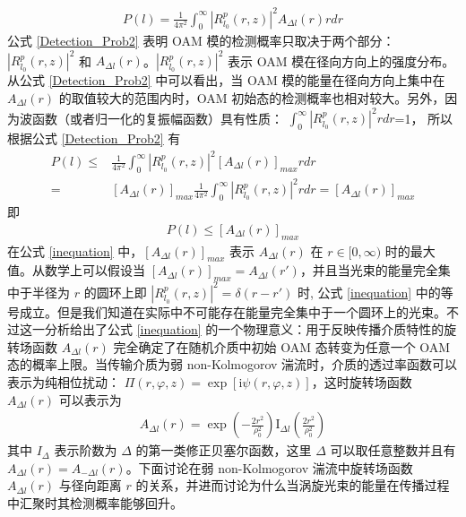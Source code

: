 \documentclass[master]{thesis-uestc}
\begin{document}
\begin{equation}\label{Detection_Prob2}
 \begin{split}
 P(l)=\frac{1}{4\pi^2}\int_0^{\infty}|R_{l_0}^p(r,z)|^2 A_{\Delta l}(r)rdr
 \end{split}
\end{equation}
\noindent 公式 \eqref{Detection_Prob2} 表明 OAM 模的检测概率只取决于两个部分：$|R_{l_0}^p(r,z)|^2$ 和 $A_{\Delta l}(r)$。$|R_{l_0}^p(r,z)|^2$ 表示 OAM 模在径向方向上的强度分布。从公式 \eqref{Detection_Prob2} 中可以看出，当 OAM 模的能量在径向方向上集中在 $A_{\Delta l}(r)$ 的取值较大的范围内时，OAM 初始态的检测概率也相对较大。另外，因为波函数（或者归一化的复振幅函数）具有性质： $\int_0^{\infty}|R_{l_0}^p(r,z)|^2 rdr$=1， 所以根据公式 \eqref{Detection_Prob2} 有
\begin{equation}\label{inequation1}
\begin{split}
P(l)\leq & \frac{1}{4\pi^2}\int_0^{\infty}|R_{l_0}^p(r,z)|^2 [A_{\Delta l}(r)]_{max}rdr\\
        =& [A_{\Delta l}(r)]_{max}\frac{1}{4\pi^2}\int_0^{\infty}|R_{l_0}^p(r,z)|^2rdr=[A_{\Delta l}(r)]_{max}
\end{split}
\end{equation}\label{inequation1}
\noindent 即
\begin{equation}\label{inequation}
 \begin{split}
 P(l)\leq [A_{\Delta l}(r)]_{max}
 \end{split}
\end{equation}
\noindent 在公式 \eqref{inequation} 中，$[A_{\Delta l}(r)]_{max}$ 表示 $A_{\Delta l}(r)$ 在 $r\in[0,\infty)$ 时的最大值。从数学上可以假设当 $[A_{\Delta l}(r)]_{max}=A_{\Delta l}(r')$，并且当光束的能量完全集中于半径为 $r$ 的圆环上即 $|R_{l_0}^p(r,z)|^2=\delta (r-r')$ 时, 公式 \eqref{inequation} 中的等号成立。但是我们知道在实际中不可能存在能量完全集中于一个圆环上的光束。不过这一分析给出了公式 \eqref{inequation} 的一个物理意义：用于反映传播介质特性的旋转场函数 $A_{\Delta l}(r)$ 完全确定了在随机介质中初始 OAM 态转变为任意一个 OAM 态的概率上限。当传输介质为弱 non-Kolmogorov 湍流时，介质的透过率函数可以表示为纯相位扰动： $\Pi(r,\varphi,z)=\exp[\mathrm{i}\psi(r,\varphi,z)]$，这时旋转场函数 $A_{\Delta l}(r)$ 可以表示为
\begin{equation}\label{non-Kolmogorov_RFF}
 \begin{split}
 A_{\Delta l}(r)=\exp\left(-\frac{2r^2}{\rho^2_0}\right)\mathrm{I}_{\Delta l}\left(\frac{2r^2}{\rho^2_0}\right)
 \end{split}
\end{equation}
其中 $I_\Delta$ 表示阶数为 $\Delta$ 的第一类修正贝塞尔函数，这里 $\Delta$ 可以取任意整数并且有 $A_{\Delta l}(r)=A_{-\Delta l}(r)$。下面讨论在弱 non-Kolmogorov 湍流中旋转场函数 $A_{\Delta l}(r)$ 与径向距离 $r$ 的关系，并进而讨论为什么当涡旋光束的能量在传播过程中汇聚时其检测概率能够回升。
\end{document}
